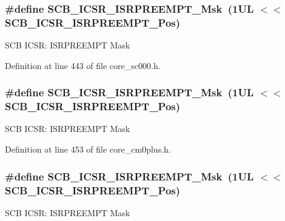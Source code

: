 \subsubsection[{\texorpdfstring{S\+C\+B\+\_\+\+I\+C\+S\+R\+\_\+\+I\+S\+R\+P\+R\+E\+E\+M\+P\+T\+\_\+\+Msk}{SCB_ICSR_ISRPREEMPT_Msk}}]{\setlength{\rightskip}{0pt plus 5cm}\#define S\+C\+B\+\_\+\+I\+C\+S\+R\+\_\+\+I\+S\+R\+P\+R\+E\+E\+M\+P\+T\+\_\+\+Msk~(1\+U\+L $<$$<$ S\+C\+B\+\_\+\+I\+C\+S\+R\+\_\+\+I\+S\+R\+P\+R\+E\+E\+M\+P\+T\+\_\+\+Pos)}\hypertarget{group___c_m_s_i_s___s_c_b_gaa966600396290808d596fe96e92ca2b5}{}\label{group___c_m_s_i_s___s_c_b_gaa966600396290808d596fe96e92ca2b5}
S\+CB I\+C\+SR\+: I\+S\+R\+P\+R\+E\+E\+M\+PT Mask 

Definition at line 443 of file core\+\_\+sc000.\+h.

\subsubsection[{\texorpdfstring{S\+C\+B\+\_\+\+I\+C\+S\+R\+\_\+\+I\+S\+R\+P\+R\+E\+E\+M\+P\+T\+\_\+\+Msk}{SCB_ICSR_ISRPREEMPT_Msk}}]{\setlength{\rightskip}{0pt plus 5cm}\#define S\+C\+B\+\_\+\+I\+C\+S\+R\+\_\+\+I\+S\+R\+P\+R\+E\+E\+M\+P\+T\+\_\+\+Msk~(1\+U\+L $<$$<$ S\+C\+B\+\_\+\+I\+C\+S\+R\+\_\+\+I\+S\+R\+P\+R\+E\+E\+M\+P\+T\+\_\+\+Pos)}\hypertarget{group___c_m_s_i_s___s_c_b_gaa966600396290808d596fe96e92ca2b5}{}\label{group___c_m_s_i_s___s_c_b_gaa966600396290808d596fe96e92ca2b5}
S\+CB I\+C\+SR\+: I\+S\+R\+P\+R\+E\+E\+M\+PT Mask 

Definition at line 453 of file core\+\_\+cm0plus.\+h.

\subsubsection[{\texorpdfstring{S\+C\+B\+\_\+\+I\+C\+S\+R\+\_\+\+I\+S\+R\+P\+R\+E\+E\+M\+P\+T\+\_\+\+Msk}{SCB_ICSR_ISRPREEMPT_Msk}}]{\setlength{\rightskip}{0pt plus 5cm}\#define S\+C\+B\+\_\+\+I\+C\+S\+R\+\_\+\+I\+S\+R\+P\+R\+E\+E\+M\+P\+T\+\_\+\+Msk~(1\+U\+L $<$$<$ S\+C\+B\+\_\+\+I\+C\+S\+R\+\_\+\+I\+S\+R\+P\+R\+E\+E\+M\+P\+T\+\_\+\+Pos)}\hypertarget{group___c_m_s_i_s___s_c_b_gaa966600396290808d596fe96e92ca2b5}{}\label{group___c_m_s_i_s___s_c_b_gaa966600396290808d596fe96e92ca2b5}
S\+CB I\+C\+SR\+: I\+S\+R\+P\+R\+E\+E\+M\+PT Mask 

